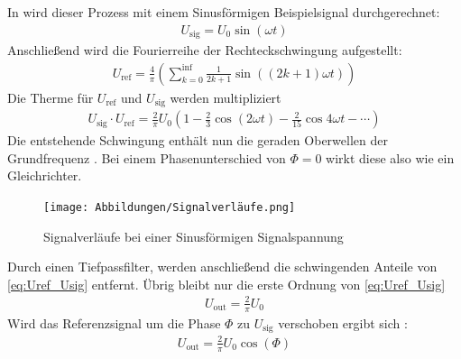 In \cite[vgl.][]{man:v303} wird dieser Prozess mit einem Sinusförmigen Beispielsignal durchgerechnet:
\begin{align}
    U_\text{sig} = U_{0} \sin(\omega t) 
\end{align}
Anschließend wird die Fourierreihe der Rechteckschwingung aufgestellt:
% 
\begin{align}
    U_\text{ref} = \frac{4}{\pi} \left(\sum_{k=0}^{\inf} \frac{1}{2k+1} \sin((2k+1)\omega t)\right)
\end{align}
Die Therme für $U_\text{ref}$ und $U_\text{sig}$ werden multipliziert
\begin{align}
    U_\text{sig} \cdot U_\text{ref} = 
    \frac{2}{\pi} U_0 \left(1 - \frac{2}{3} \cos(2 \omega t) - \frac{2}{15}\cos{4 \omega t} - \cdots \right) 
    \label{eq:Uref_Usig}
\end{align}
Die entstehende Schwingung enthält nun die geraden Oberwellen der Grundfrequenz \cite[vgl.][]{man:v303}.
Bei einem Phasenunterschied von $\Phi=0$ wirkt diese also wie ein Gleichrichter.
\begin{figure}
    \centering
    \texttt{[image: Abbildungen/Signalverläufe.png]}
    \caption{Signalverläufe bei einer Sinusförmigen Signalspannung \cite{man:v303}}
\end{figure}
Durch einen Tiefpassfilter, werden anschließend die schwingenden Anteile von \ref{eq:Uref_Usig} entfernt.
Übrig bleibt nur die erste Ordnung von \ref{eq:Uref_Usig}
\begin{align}
    U_\text{out} = \frac{2}{\pi} U_0
\end{align}
Wird das Referenzsignal um die Phase $\Phi$ zu $U_\text{sig}$ verschoben ergibt sich \cite[vgl.][]{man:v303}:
\begin{align}
    U_\text{out} = \frac{2}{\pi} U_0 \cos(\Phi)
    \label{eq:Uout_von_Phi}
\end{align}
